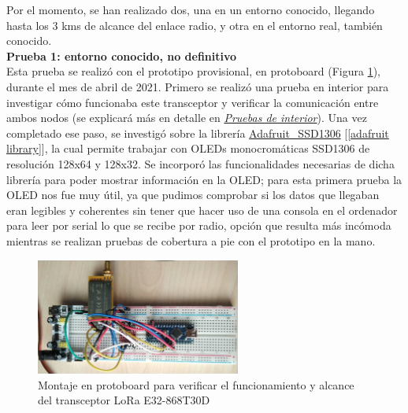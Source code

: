\documentclass[12pt]{article}
\begin{document}
	\noindent Por el momento, se han realizado dos, una en un entorno conocido, llegando hasta los 3 kms de alcance del enlace radio, y otra en el entorno real, también conocido. \\
	
	\noindent \textbf{Prueba 1: entorno conocido, no definitivo} \\
	
	\noindent Esta prueba se realizó con el prototipo provisional, en protoboard (Figura \ref{protoboard lora}), durante el mes de abril de 2021. Primero se realizó una prueba en interior para investigar cómo funcionaba este transceptor y verificar la comunicación entre ambos nodos (se explicará más en detalle en \hyperref[pruebas de interior]{\textit{Pruebas de interior}}). Una vez completado ese paso, se investigó sobre la librería \href{https://github.com/adafruit/Adafruit_SSD1306}{Adafruit\_SSD1306} [\ref{adafruit library}], la cual permite trabajar con OLEDs monocromáticas SSD1306 de resolución 128x64 y 128x32. Se incorporó las funcionalidades necesarias de dicha librería para poder mostrar información en la OLED; para esta primera prueba la OLED nos fue muy útil, ya que pudimos comprobar si los datos que llegaban eran legibles y coherentes sin tener que hacer uso de una consola en el ordenador para leer por serial lo que se recibe por radio, opción que resulta más incómoda mientras se realizan pruebas de cobertura a pie con el prototipo en la mano.\\
	
	
	\begin{figure}[h!]
		\begin{center}
			\includegraphics[width=0.6\textwidth]{img/prueba_lora_protoboard_rotated.png}
			\caption{Montaje en protoboard para verificar el funcionamiento y alcance del transceptor LoRa E32-868T30D}
			\label{protoboard lora}
		\end{center}
	\end{figure}

	\pagebreak
	
\end{document}
